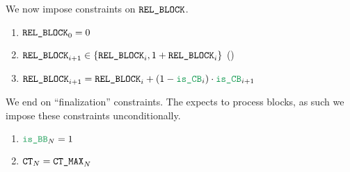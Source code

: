 We now impose constraints on $\texttt{REL\_BLOCK}$.
\begin{enumerate}[resume]
	\item $\texttt{REL\_BLOCK} _{0} = 0$
	\item $\texttt{REL\_BLOCK} _{i + 1} \in \{ \texttt{REL\_BLOCK}_{i}, 1 + \texttt{REL\_BLOCK}_{i} \}$ \quad (\sanityCheck)
	\item $\relBlock _{i + 1} = \relBlock _{i} + (1 - \locIsCoinbase _{i}) \cdot \locIsCoinbase _{i + 1}$
\end{enumerate}
We end on ``finalization'' constraints.
The \zkEvm{} expects to process blocks, as such we impose these constraints unconditionally.
\begin{enumerate}[resume]
	\item $\locIsBlobBasefee _{N} = 1$
	\item $\texttt{CT} _{N} = \texttt{CT\_MAX} _{N}$
\end{enumerate}
